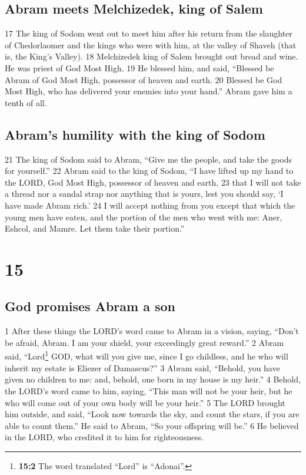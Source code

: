 \hypertarget{abram-meets-melchizedek-king-of-salem}{%
\subsection{Abram meets Melchizedek, king of
Salem}\label{abram-meets-melchizedek-king-of-salem}}

{17} The king of Sodom went out to meet him after his return from the
slaughter of Chedorlaomer and the kings who were with him, at the valley
of Shaveh (that is, the King's Valley). {18} Melchizedek king of Salem
brought out bread and wine. He was priest of God Most High. {19} He
blessed him, and said, ``Blessed be Abram of God Most High, possessor of
heaven and earth. {20} Blessed be God Most High, who has delivered your
enemies into your hand.'' Abram gave him a tenth of all.

\hypertarget{abrams-humility-with-the-king-of-sodom}{%
\subsection{Abram's humility with the king of
Sodom}\label{abrams-humility-with-the-king-of-sodom}}

{21} The king of Sodom said to Abram, ``Give me the people, and take the
goods for yourself.'' {22} Abram said to the king of Sodom, ``I have
lifted up my hand to the LORD, God Most High, possessor of heaven and
earth, {23} that I will not take a thread nor a sandal strap nor
anything that is yours, lest you should say, `I have made Abram rich.'
{24} I will accept nothing from you except that which the young men have
eaten, and the portion of the men who went with me: Aner, Eshcol, and
Mamre. Let them take their portion.''

\hypertarget{section-14}{%
\section{15}\label{section-14}}

\hypertarget{god-promises-abram-a-son}{%
\subsection{God promises Abram a son}\label{god-promises-abram-a-son}}

{1} After these things the LORD's word came to Abram in a vision,
saying, ``Don't be afraid, Abram. I am your shield, your exceedingly
great reward.'' {2} Abram said, ``Lord\footnote{\textbf{15:2} The word
  translated ``Lord'' is ``Adonai''.} GOD, what will you give me, since
I go childless, and he who will inherit my estate is Eliezer of
Damascus?'' {3} Abram said, ``Behold, you have given no children to me:
and, behold, one born in my house is my heir.'' {4} Behold, the LORD's
word came to him, saying, ``This man will not be your heir, but he who
will come out of your own body will be your heir.'' {5} The LORD brought
him outside, and said, ``Look now towards the sky, and count the stars,
if you are able to count them.'' He said to Abram, ``So your offspring
will be.'' {6} He believed in the LORD, who credited it to him for
righteousness.

